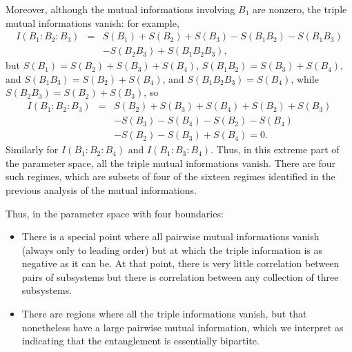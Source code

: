 \documentclass[12pt]{article}
\numberwithin{equation}{section}
\begin{document}
Moreover, although the mutual informations involving $B_1$ are nonzero, the triple mutual informations vanish: for example,
%
\begin{eqnarray}
I(B_1 : B_2 : B_3) &=& S(B_1) + S(B_2) + S(B_3) - S(B_1   B_2) - S(B_1   B_3)
\\ &&- S(B_2   B_3) + S(B_1   B_2   B_3), \nonumber
\end{eqnarray}
%
but $S(B_1) = S(B_2) + S(B_3) + S(B_4)$, $S(B_1   B_2) = S(B_3) + S(B_4)$, and $S(B_1   B_3) = S(B_2) + S(B_4)$, and $S(B_1   B_2   B_3) = S(B_4)$, while $S(B_2   B_3) = S(B_2) + S(B_3)$, so
\begin{eqnarray}
I(B_1 : B_2 : B_3) &=& S(B_2) + S(B_3) + S(B_4) + S(B_2) + S(B_3) \\ &&- S(B_3) - S(B_4) - S(B_2) - S(B_4)\nonumber \\ && - S(B_2) - S(B_3) + S(B_4) = 0 . \nonumber
\end{eqnarray}
%
Similarly for $I(B_1 : B_2 : B_4)$ and $I(B_1 : B_3 : B_4)$. Thus, in this extreme part of the parameter space, all the triple mutual informations vanish. There are four such regimes, which are subsets of four of the sixteen regimes identified in the previous analysis of the mutual informations.

Thus, in the parameter space with four boundaries:
\begin{itemize}
\item
There is a special point where all pairwise mutual informations vanish (always only to leading order) but at which the triple information is as negative as it can be. At that point, there is very little correlation between pairs of subsystems but there is correlation between any collection of three subsystems.
\item There are regions where all the triple informations vanish, but that nonetheless have a large pairwise mutual information, which we interpret as indicating that the entanglement is essentially bipartite.
\end{itemize}
\end{document}
